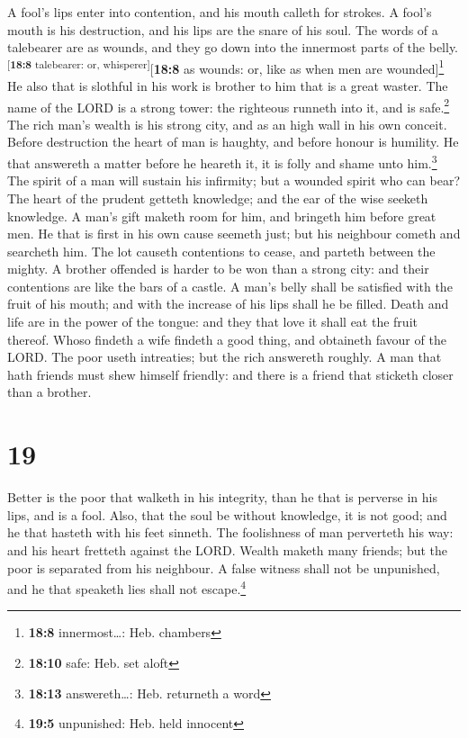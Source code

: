  A fool's lips enter into contention, and his mouth
calleth for strokes.  A fool's mouth is his destruction,
and his lips are the snare of his soul.  The words of a
talebearer are as wounds, and they go down into the innermost parts of
the belly.\textsuperscript{{[}\textbf{18:8} talebearer: or,
whisperer{]}}{[}\textbf{18:8} as wounds: or, like as when men are
wounded{]}\footnote{\textbf{18:8} innermost\ldots: Heb. chambers}
 He also that is slothful in his work is brother to him
that is a great waster.  The name of the LORD is a strong
tower: the righteous runneth into it, and is safe.\footnote{\textbf{18:10}
  safe: Heb. set aloft}  The rich man's wealth is his
strong city, and as an high wall in his own conceit. 
Before destruction the heart of man is haughty, and before honour is
humility.  He that answereth a matter before he heareth
it, it is folly and shame unto him.\footnote{\textbf{18:13}
  answereth\ldots: Heb. returneth a word}  The spirit of
a man will sustain his infirmity; but a wounded spirit who can bear?
 The heart of the prudent getteth knowledge; and the ear
of the wise seeketh knowledge.  A man's gift maketh room
for him, and bringeth him before great men.  He that is
first in his own cause seemeth just; but his neighbour cometh and
searcheth him.  The lot causeth contentions to cease, and
parteth between the mighty.  A brother offended is harder
to be won than a strong city: and their contentions are like the bars of
a castle.  A man's belly shall be satisfied with the
fruit of his mouth; and with the increase of his lips shall he be
filled.  Death and life are in the power of the tongue:
and they that love it shall eat the fruit thereof.  Whoso
findeth a wife findeth a good thing, and obtaineth favour of the LORD.
 The poor useth intreaties; but the rich answereth
roughly.  A man that hath friends must shew himself
friendly: and there is a friend that sticketh closer than a brother.

\hypertarget{section-18}{%
\section{19}\label{section-18}}

 Better is the poor that walketh in his integrity, than he
that is perverse in his lips, and is a fool.  Also, that
the soul be without knowledge, it is not good; and he that hasteth with
his feet sinneth.  The foolishness of man perverteth his
way: and his heart fretteth against the LORD.  Wealth
maketh many friends; but the poor is separated from his neighbour.
 A false witness shall not be unpunished, and he that
speaketh lies shall not escape.\footnote{\textbf{19:5} unpunished: Heb.
  held innocent}

